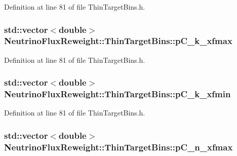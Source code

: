 Definition at line 81 of file Thin\-Target\-Bins.\-h.

\hypertarget{class_neutrino_flux_reweight_1_1_thin_target_bins_a180c280fc86b8b00711dfe8285265442}{
\subsubsection[{p\-C\-\_\-k\-\_\-xfmax}]{\setlength{\rightskip}{0pt plus 5cm}std\-::vector$<$double$>$ Neutrino\-Flux\-Reweight\-::\-Thin\-Target\-Bins\-::p\-C\-\_\-k\-\_\-xfmax}}\label{class_neutrino_flux_reweight_1_1_thin_target_bins_a180c280fc86b8b00711dfe8285265442}


Definition at line 81 of file Thin\-Target\-Bins.\-h.

\hypertarget{class_neutrino_flux_reweight_1_1_thin_target_bins_a6ea704e14228a94c3224989545b68e43}{
\subsubsection[{p\-C\-\_\-k\-\_\-xfmin}]{\setlength{\rightskip}{0pt plus 5cm}std\-::vector$<$double$>$ Neutrino\-Flux\-Reweight\-::\-Thin\-Target\-Bins\-::p\-C\-\_\-k\-\_\-xfmin}}\label{class_neutrino_flux_reweight_1_1_thin_target_bins_a6ea704e14228a94c3224989545b68e43}


Definition at line 81 of file Thin\-Target\-Bins.\-h.

\hypertarget{class_neutrino_flux_reweight_1_1_thin_target_bins_ad610d70e8ad55e62356d7bdcd06c53ab}{
\subsubsection[{p\-C\-\_\-n\-\_\-xfmax}]{\setlength{\rightskip}{0pt plus 5cm}std\-::vector$<$double$>$ Neutrino\-Flux\-Reweight\-::\-Thin\-Target\-Bins\-::p\-C\-\_\-n\-\_\-xfmax}}\label{class_neutrino_flux_reweight_1_1_thin_target_bins_ad610d70e8ad55e62356d7bdcd06c53ab}


